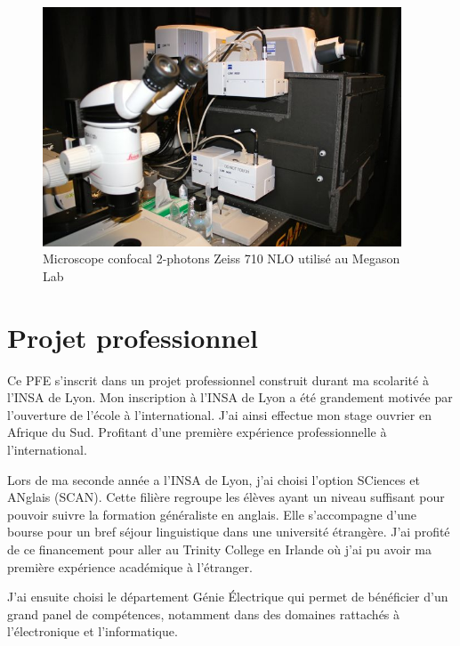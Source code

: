\begin{figure}[htb]
\begin{center}
\leavevmode
\includegraphics[width=0.95\textwidth]{pictures/PICmicroscope}
\end{center}
\caption{Microscope confocal 2-photons Zeiss 710 NLO utilisé au Megason Lab}
\label{fig:MicMegason}
\end{figure}

\clearpage





%


\chapter{Projet professionnel}

Ce PFE s'inscrit dans un projet professionnel construit durant ma scolarité à l'INSA de Lyon.
Mon inscription à l'INSA de Lyon a été grandement motivée par l'ouverture de l'école à l'international. J'ai ainsi effectue mon stage ouvrier en Afrique du Sud. Profitant d'une première expérience professionnelle à l'international.

Lors de ma seconde année a l'INSA de Lyon, j'ai choisi l'option SCiences et ANglais (SCAN).
Cette filière regroupe les élèves ayant un niveau suffisant pour pouvoir suivre la formation généraliste en anglais.
Elle s'accompagne d'une bourse pour un bref séjour linguistique dans une université étrangère.
J'ai profité de ce financement pour aller au Trinity College en Irlande où
j'ai pu avoir ma première expérience académique à l'étranger.

J'ai ensuite choisi le département
Génie Électrique qui permet de bénéficier d'un grand panel de compétences,
notamment dans des domaines rattachés à l'électronique et l'informatique.


